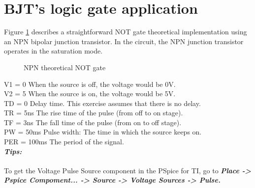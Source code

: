 \section{BJT's logic gate application}
Figure \ref{lab3_notGate_de} describes a straightforward NOT gate theoretical implementation using an NPN bipolar junction transistor. In the circuit, the NPN junction transistor operates in the saturation mode.

\begin{figure}[H]
    \centering
    \caption{NPN theoretical NOT gate}
    \label{lab3_notGate_de}
\end{figure}

V1 = 0  When the source is off, the voltage would be 0V.\\
V2 = 5  When the source is on, the voltage would be 5V.\\
TD = 0  Delay time. This exercise assumes that there is no delay.\\
TR = 5ns  The rise time of the pulse (from off to on stage).\\
TF = 3ns  The fall time of the pulse (from on to off stage).\\
PW = 50ms  Pulse width: The time in which the source keeps on.\\
PER = 100ms  The period of the signal.\\

\textbf{\textit{Tips:}}\\
\\
To get the Voltage Pulse Source component in the PSpice for TI, go to \textbf{\textit{Place -> Pspice Compoment... -> Source -> Voltage Sources -> Pulse.}}
